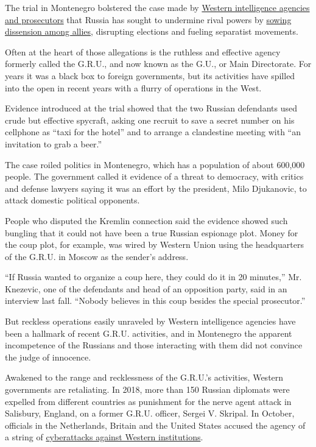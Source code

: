 The trial in Montenegro bolstered the case made by
\href{https://www.nytimes.com/2018/07/13/us/politics/mueller-indictment-russian-intelligence-hacking.html}{Western
intelligence agencies and prosecutors} that Russia has sought to
undermine rival powers by
\href{https://www.nytimes.com/2017/11/15/world/europe/russia-brexit-twitter-facebook.html}{sowing
dissension among allies}, disrupting elections and fueling separatist
movements.

Often at the heart of those allegations is the ruthless and effective
agency formerly called the G.R.U., and now known as the G.U., or Main
Directorate. For years it was a black box to foreign governments, but
its activities have spilled into the open in recent years with a flurry
of operations in the West.

Evidence introduced at the trial showed that the two Russian defendants
used crude but effective spycraft, asking one recruit to save a secret
number on his cellphone as ``taxi for the hotel'' and to arrange a
clandestine meeting with ``an invitation to grab a beer.''

The case roiled politics in Montenegro, which has a population of about
600,000 people. The government called it evidence of a threat to
democracy, with critics and defense lawyers saying it was an effort by
the president, Milo Djukanovic, to attack domestic political opponents.

People who disputed the Kremlin connection said the evidence showed such
bungling that it could not have been a true Russian espionage plot.
Money for the coup plot, for example, was wired by Western Union using
the headquarters of the G.R.U. in Moscow as the sender's address.

``If Russia wanted to organize a coup here, they could do it in 20
minutes,'' Mr. Knezevic, one of the defendants and head of an opposition
party, said in an interview last fall. ``Nobody believes in this coup
besides the special prosecutor.''

But reckless operations easily unraveled by Western intelligence
agencies have been a hallmark of recent G.R.U. activities, and in
Montenegro the apparent incompetence of the Russians and those
interacting with them did not convince the judge of innocence.

Awakened to the range and recklessness of the G.R.U.'s activities,
Western governments are retaliating. In 2018, more than 150 Russian
diplomats were expelled from different countries as punishment for the
nerve agent attack in Salisbury, England, on a former G.R.U. officer,
Sergei V. Skripal. In October, officials in the Netherlands, Britain and
the United States accused the agency of a string of
\href{https://www.nytimes.com/2018/10/04/us/politics/russia-hacks-doping-poisoning.html}{cyberattacks
against Western institutions}.

